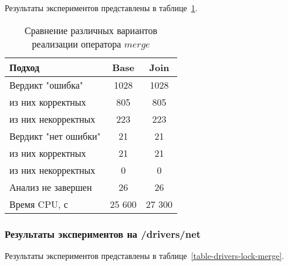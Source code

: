 Результаты экспериментов представлены в таблице~\ref{table-svcomp-lock-merge}.

\begin{center}
  \begin{table}[h]\footnotesize \centering
  	\label{table-svcomp-lock-merge}
    \caption{Сравнение различных вариантов реализации оператора $merge$}
    \begin{tabular}{ | l | c | c |}
      \hline
      Подход         				& Base 		& Join 		\\ \hline
      Вердикт "ошибка" 				& 1028   	& 1028   	\\ 
  \hspace{0.5cm} из них корректных 	& 805 		& 805 	 	\\ 
  \hspace{0.5cm} из них некорректных & 223 		& 223 	   	\\ \hline
      Вердикт "нет ошибки"  		& 21    	& 21     	\\ 
  \hspace{0.5cm} из них корректных 	& 21 		& 21    	\\
  \hspace{0.5cm} из них некорректных & 0 		& 0    	  	\\ \hline
      Анализ не завершен       		& 26    	& 26      	\\ \hline
      Время CPU, с   				& 25 600 	& 27 300  	\\ 
      \hline
    \end{tabular}
  \end{table}
\end{center}

\subsubsection{Результаты экспериментов на /drivers/net}

Результаты экспериментов представлены в таблице~\ref{table-drivers-lock-merge}.

